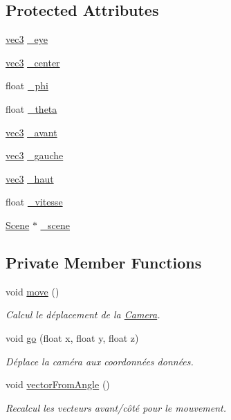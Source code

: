 \subsection*{Protected Attributes}
\begin{DoxyCompactItemize}
\item 
\hyperlink{structvec3}{vec3} \hyperlink{class_camera_ad4c22c27bd247f4411c4166220ba6e82}{\+\_\+eye}
\item 
\hyperlink{structvec3}{vec3} \hyperlink{class_camera_ad80a82cbc81e6d8ba04c7cc1ac7ba0d7}{\+\_\+center}
\item 
float \hyperlink{class_camera_a288df53a3ff446ee4367ee47b8499fcd}{\+\_\+phi}
\item 
float \hyperlink{class_camera_aeb3c859c3c254c8296420451259e5629}{\+\_\+theta}
\item 
\hyperlink{structvec3}{vec3} \hyperlink{class_camera_ab7cf8c1eae6b2f35a20e8abd1f0570c9}{\+\_\+avant}
\item 
\hyperlink{structvec3}{vec3} \hyperlink{class_camera_aaf97dba7663b99065d8d508b589224de}{\+\_\+gauche}
\item 
\hyperlink{structvec3}{vec3} \hyperlink{class_camera_af860db197a7abbf0284df4e32a95a347}{\+\_\+haut}
\item 
float \hyperlink{class_camera_a9062fdde515a49bf8db963ac46be9942}{\+\_\+vitesse}
\item 
\hyperlink{class_scene}{Scene} $\ast$ \hyperlink{class_camera_a81ffb00eedbaefbfb755b0c13d42180a}{\+\_\+scene}
\end{DoxyCompactItemize}
\subsection*{Private Member Functions}
\begin{DoxyCompactItemize}
\item 
void \hyperlink{class_camera_a8414e6d74d3f6259fa5ea1f037e9d8bd}{move} ()
\begin{DoxyCompactList}\small\item\em Calcul le déplacement de la \hyperlink{class_camera}{Camera}. \end{DoxyCompactList}\item 
void \hyperlink{class_camera_abde0ff477fb0baea7515767dcd7a7cf7}{go} (float x, float y, float z)
\begin{DoxyCompactList}\small\item\em Déplace la caméra aux coordonnées données. \end{DoxyCompactList}\item 
void \hyperlink{class_camera_aa4e815462a964caa6b10804e33119cf2}{vector\+From\+Angle} ()
\begin{DoxyCompactList}\small\item\em Recalcul les vecteurs avant/côté pour le mouvement. \end{DoxyCompactList}\end{DoxyCompactItemize}



